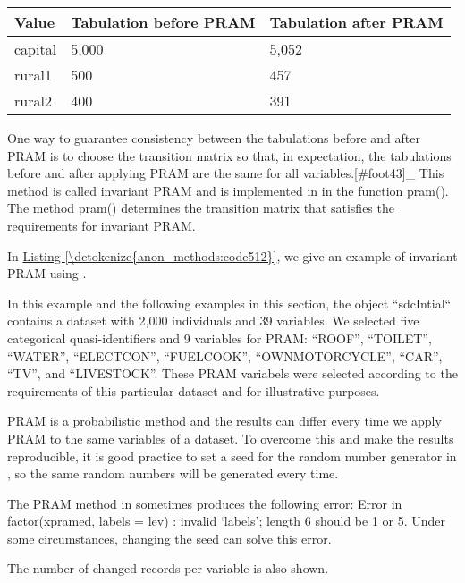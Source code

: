 \documentclass[letterpaper,10pt,english]{sphinxmanual}
\begin{document}
\begin{savenotes}\sphinxattablestart
\centering
{}
\label{\detokenize{anon_methods:tab58}}\label{\detokenize{anon_methods:id35}}
\sphinxaftercaption
\begin{tabulary}{\linewidth}[t]{|T|T|T|}
\hline
\sphinxstyletheadfamily 
Value
&\sphinxstyletheadfamily 
Tabulation before PRAM
&\sphinxstyletheadfamily 
Tabulation after PRAM
\\
\hline
capital
&
5,000
&
5,052
\\
\hline
rural1
&
500
&
457
\\
\hline
rural2
&
400
&
391
\\
\hline
\end{tabulary}
\par
\sphinxattableend\end{savenotes}

One way to guarantee consistency between the tabulations before and
after PRAM is to choose the transition matrix so that, in expectation,
the tabulations before and after applying PRAM are the same for all
variables.{[}\#foot43{]}\_ This method is called invariant PRAM
and is implemented in  in the function pram(). The method
pram() determines the transition matrix that satisfies the requirements
for invariant PRAM. 

In \hyperref[\detokenize{anon_methods:code512}]{Listing \ref{\detokenize{anon_methods:code512}}}, we give an example of invariant PRAM using
. %
\begin{footnote}[11]\sphinxAtStartFootnote
In this example and the following examples in this section, the
 object “sdcIntial“ contains a dataset with 2,000
individuals and 39 variables. We selected five categorical
quasi-identifiers and 9 variables for PRAM: “ROOF”, “TOILET”,
“WATER”, “ELECTCON”, “FUELCOOK”, “OWNMOTORCYCLE”, “CAR”, “TV”, and
“LIVESTOCK”. These PRAM variabels were selected according to the
requirements of this particular dataset and for illustrative
purposes.
%
\end{footnote} PRAM is a probabilistic method and the
results can differ every time we apply PRAM to the same variables of a
dataset. To overcome this and make the results reproducible, it is good
practice to set a seed for the random number generator in , so the
same random numbers will be generated every time. %
\begin{footnote}[12]\sphinxAtStartFootnote
The PRAM method in  sometimes produces the following
error: Error in factor(xpramed, labels = lev) : invalid ‘labels’;
length 6 should be 1 or 5. Under some circumstances, changing the
seed can solve this error.
%
\end{footnote}
The number of changed records per variable is also shown.
\end{document}
